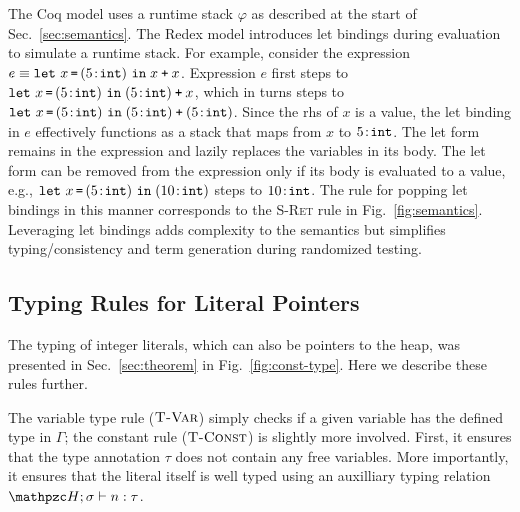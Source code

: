 The Coq model uses a runtime stack $\varphi$ as described at the start
of Sec.~\ref{sec:semantics}.
The Redex model introduces let bindings during evaluation to
simulate a runtime stack. For example, consider the expression 
$e \equiv \mathtt{let}~x\, \texttt{=}\, ({5}\!:\!{\mathtt{int}})~\mathtt{in}\;{x \mathbin{\texttt{+}} x}$. Expression $e$ first steps to
$\mathtt{let}~x\, \texttt{=}\, ({5}\!:\!{\mathtt{int}})~\mathtt{in}\;{({5}\!:\!{\mathtt{int}}) \mathbin{\texttt{+}} x}$, which in
turns steps to
$\mathtt{let}~x\, \texttt{=}\, ({5}\!:\!{\mathtt{int}})~\mathtt{in}\;{({5}\!:\!{\mathtt{int}}) \mathbin{\texttt{+}} ({5}\!:\!{\mathtt{int}})}$. Since
the rhs of $x$ is a value, the let binding in $e$ effectively
functions as a stack that maps from $x$ to ${5}\!:\!{\mathtt{int}}$. The
let form remains in the expression and lazily replaces the variables
in its body. The let form can be removed from the expression only if its
body is evaluated to a value, e.g., 
$\mathtt{let}~x\, \texttt{=}\, ({5}\!:\!{\mathtt{int}})~\mathtt{in}\;{({10}\!:\!{\mathtt{int}})}$
steps to 
${10}\!:\!{\mathtt{int}}$. The rule for popping let bindings in this manner
corresponds to the \textsc{S-Ret} rule in Fig.~\ref{fig:semantics}.
Leveraging let bindings adds complexity to the semantics but
simplifies typing/consistency and term generation during randomized testing.

\subsection{Typing Rules for Literal Pointers}\label{sec:literal-pointer-typing}

The typing of integer literals, which can also be pointers to the
heap, was presented in Sec.~\ref{sec:theorem} in Fig.~\ref{fig:const-type}. Here
we describe these rules further.

The variable type rule
($\textsc{T-Var}$) simply checks if a given variable has the defined
type in $\Gamma$; the constant rule ($\textsc{T-Const}$) is slightly
more involved.  First, it ensures that the type annotation $\tau$ does
not contain any free variables. More importantly, it ensures that the
literal itself is well typed using an auxilliary typing relation
$\heap;\sigma \vdash n : \tau$.

